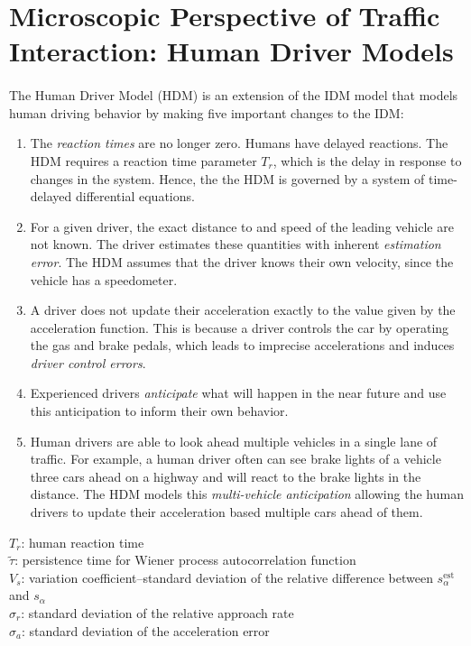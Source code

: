 \documentclass[12pt]{article}
\begin{document}
\section{Microscopic Perspective of Traffic Interaction: Human Driver Models}
\paragraph{}
The Human Driver Model (HDM) is an extension of the IDM model that models human driving behavior by making five important changes to the IDM:
\begin{enumerate}
  \item The\textit{ reaction times} are no longer zero.  Humans have delayed reactions.  The HDM requires a reaction time parameter $T_r$, which is the delay in response to changes in the system.  Hence, the the HDM is governed by a system of time-delayed differential equations.
  \item For a given driver, the exact distance to and speed of the leading vehicle are not known.  The driver estimates these quantities with inherent \textit{estimation error}.  The HDM assumes that the driver knows their own velocity, since the vehicle has a speedometer.
  \item A driver does not update their acceleration exactly to the value given by the acceleration function.  This is because a driver controls the car by operating the gas and brake pedals, which leads to imprecise accelerations and induces \textit{driver control errors}.
  \item Experienced drivers \textit{anticipate} what will happen in the near future and use this anticipation to inform their own behavior.
  \item Human drivers are able to look ahead multiple vehicles in a single lane of traffic.  For example, a human driver often can see brake lights of a vehicle three cars ahead on a highway and will react to the brake lights in the distance. The HDM models this \textit{multi-vehicle anticipation} allowing the human drivers to update their acceleration based multiple cars ahead of them.
\end{enumerate}
\begin{mymathbox}[title=HDM Parameters,colframe=blue!30!black]
  $T_r$: human reaction time\\
  $\tilde{\tau}$: persistence time for Wiener process autocorrelation function\\
  $V_s$: variation coefficient\---standard deviation of the relative difference between $s_\alpha^\text{est}$ and $s_\alpha$\\
  $\sigma_r$: standard deviation of the relative approach rate\\
  $\sigma_a$: standard deviation of the acceleration error
\end{mymathbox}
\end{document}
